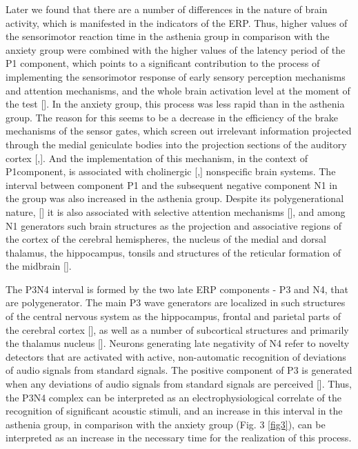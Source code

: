 \documentclass[twocolumn]{article}
\begin{document}
\par Later we found that there are a number of differences in the nature of brain activity, which is manifested in the indicators of the ERP. Thus, higher values of the sensorimotor reaction time in the asthenia group in comparison with the anxiety group were combined with the higher values of the latency period of the P1 component, which points to a significant contribution to the process of implementing the sensorimotor response of early sensory perception mechanisms and attention mechanisms, and the whole brain activation level at the moment of the test [\cite{bib17}]. In the anxiety group, this process was less rapid than in the asthenia group. The reason for this seems to be a decrease in the efficiency of the brake mechanisms of the sensor gates, which screen out irrelevant information projected through the medial geniculate bodies into the projection sections of the auditory cortex [\cite{bib18},\cite{bib19}]. And the implementation of this mechanism, in the context of P1component, is associated with cholinergic [\cite{bib20},\cite{bib21}] nonspecific brain systems. The interval between component P1 and the subsequent negative component N1 in the group was also increased in the asthenia group. Despite its polygenerational nature, [\cite{bib22}] it is also associated with selective attention mechanisms [\cite{bib23}], and among N1 generators such brain structures as the projection and associative regions of the cortex of the cerebral hemispheres, the nucleus of the medial and dorsal thalamus, the hippocampus, tonsils and structures of the reticular formation of the midbrain [\cite{bib24}].
\par The P3N4 interval is formed by the two late ERP components - P3 and N4, that are polygenerator. The main P3 wave generators are localized in such structures of the central nervous system as the hippocampus, frontal and parietal parts of the cerebral cortex [\cite{bib25}], as well as a number of subcortical structures and primarily the thalamus nucleus [\cite{bib26}]. Neurons generating late negativity of N4 refer to novelty detectors that are activated with active, non-automatic recognition of deviations of audio signals from standard signals. The positive component of P3 is generated when any deviations of audio signals from standard signals are perceived [\cite{bib27}]. Thus, the P3N4 complex can be interpreted as an electrophysiological correlate of the recognition of significant acoustic stimuli, and an increase in this interval in the asthenia group, in comparison with the anxiety group (Fig. 3 \ref{fig3}), can be interpreted as an increase in the necessary time for the realization of this process.
\end{document}
